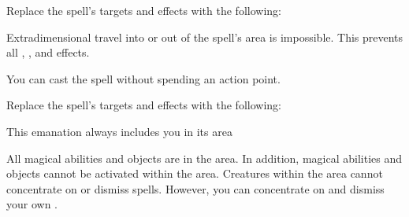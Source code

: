 


Replace the spell's targets and effects with the following:
\begin{spellcontent}

\begin{augmenttargetinginfo}




\end{augmenttargetinginfo}


\begin{augmenteffects}



\spelleffect
Extradimensional travel into or out of the spell's area is impossible.
This prevents all , , and  effects.








\end{augmenteffects}

\end{spellcontent}





You can cast the spell without spending an action point.








Replace the spell's targets and effects with the following:
\begin{spellcontent}

\begin{augmenttargetinginfo}
\spellspecial This emanation always includes you in its area



\end{augmenttargetinginfo}


\begin{augmenteffects}



\spelleffect
All magical abilities and objects are  in the area.
In addition, magical abilities and objects cannot be activated within the area.
Creatures within the area cannot concentrate on or dismiss spells.
However, you can concentrate on and dismiss your own .








\end{augmenteffects}

\end{spellcontent}




